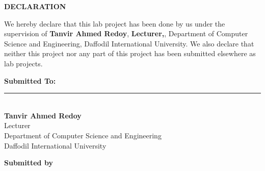 
\vspace*{1.5cm} 


\begin{center}
    {\LARGE \textbf{DECLARATION}}\\
\end{center}

\onehalfspacing

\noindent We hereby declare that this lab project has been done by us under the supervision of \textbf{Tanvir Ahmed Redoy}, \textbf{ Lecturer,}, Department of Computer Science and Engineering, Daffodil International University. We also declare that neither this project nor any part of this project has been submitted elsewhere as lab projects. 

\vspace{.8cm}

\noindent \textbf{Submitted To:} \\[1cm]

\noindent\rule{6cm}{0.4pt}\\
\textbf{Tanvir Ahmed Redoy} \\
Lecturer \\
Department of Computer Science and Engineering \\
Daffodil International University \\

\vspace{.5cm}

\begin{center}
    \textbf{Submitted by}
\end{center}

\vspace{.2cm}

